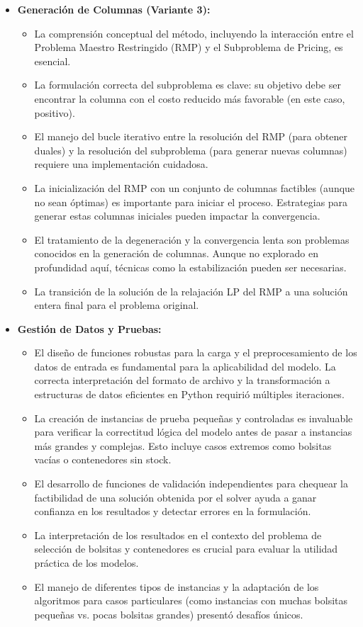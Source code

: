 \documentclass[a4paper,12pt]{article}
\begin{document}
\begin{itemize}
    \item \textbf{Generación de Columnas (Variante 3):}
    \begin{itemize}
        \item La comprensión conceptual del método, incluyendo la interacción entre el Problema Maestro Restringido (RMP) y el Subproblema de Pricing, es esencial.
        \item La formulación correcta del subproblema es clave: su objetivo debe ser encontrar la columna con el costo reducido más favorable (en este caso, positivo).
        \item El manejo del bucle iterativo entre la resolución del RMP (para obtener duales) y la resolución del subproblema (para generar nuevas columnas) requiere una implementación cuidadosa.
        \item La inicialización del RMP con un conjunto de columnas factibles (aunque no sean óptimas) es importante para iniciar el proceso. Estrategias para generar estas columnas iniciales pueden impactar la convergencia.
        \item El tratamiento de la degeneración y la convergencia lenta son problemas conocidos en la generación de columnas. Aunque no explorado en profundidad aquí, técnicas como la estabilización pueden ser necesarias.
        \item La transición de la solución de la relajación LP del RMP a una solución entera final para el problema original.
    \end{itemize}    \item \textbf{Gestión de Datos y Pruebas:}
    \begin{itemize}
        \item El diseño de funciones robustas para la carga y el preprocesamiento de los datos de entrada es fundamental para la aplicabilidad del modelo. La correcta interpretación del formato de archivo y la transformación a estructuras de datos eficientes en Python requirió múltiples iteraciones.
        \item La creación de instancias de prueba pequeñas y controladas es invaluable para verificar la correctitud lógica del modelo antes de pasar a instancias más grandes y complejas. Esto incluye casos extremos como bolsitas vacías o contenedores sin stock.
        \item El desarrollo de funciones de validación independientes para chequear la factibilidad de una solución obtenida por el solver ayuda a ganar confianza en los resultados y detectar errores en la formulación.
        \item La interpretación de los resultados en el contexto del problema de selección de bolsitas y contenedores es crucial para evaluar la utilidad práctica de los modelos.
        \item El manejo de diferentes tipos de instancias y la adaptación de los algoritmos para casos particulares (como instancias con muchas bolsitas pequeñas vs. pocas bolsitas grandes) presentó desafíos únicos.
    \end{itemize}
    

\end{itemize}
\end{document}
